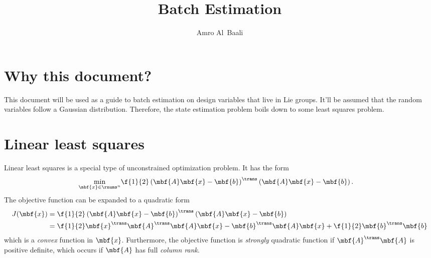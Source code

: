 \documentclass[ nobib, nofonts, notoc]{tufte-handout}
\title{Batch Estimation}
\author{Amro Al~Baali}
\begin{document}
    {
        
        \tableofcontents
        \clearpage
    }

    \section{Why this document?}
    This document will be used as a guide to batch estimation on design variables that live in Lie groups. It'll be assumed that the random variables follow a Gaussian distribution. Therefore, the state estimation problem boils down to some least squares problem.

    \section{Linear least squares}
    Linear least squares is a special type of unconstrained optimization problem. It has the form
    \begin{align}
        \label{eq:optim problem linear least squares}
        \min_{\mbf{x}\in\rnums^{n}}
        &\f{1}{2}\left( \mbf{A} \mbf{x} - \mbf{b} \right)^{\trans}\left( \mbf{A}\mbf{x} - \mbf{b} \right).
    \end{align}
    The objective function can be expanded to a quadratic form
    \begin{align}
        J(\mbf{x})
        &= \f{1}{2}\left( \mbf{A} \mbf{x} - \mbf{b} \right)^{\trans}\left( \mbf{A}\mbf{x} - \mbf{b} \right)\\
        &= \f{1}{2}\mbf{x}^{\trans}\mbf{A}^{\trans}\mbf{A}\mbf{x} - \mbf{b}^{\trans}\mbf{A}\mbf{x} + \f{1}{2}\mbf{b}^{\trans}\mbf{b}
    \end{align}
    which is a \emph{convex} function in $\mbf{x}$. Furthermore, the objective function is \emph{strongly} quadratic function if $\mbf{A}^{\trans}\mbf{A}$ is positive definite, which occurs if $\mbf{A}$ has full \emph{column rank}. 
\end{document}
